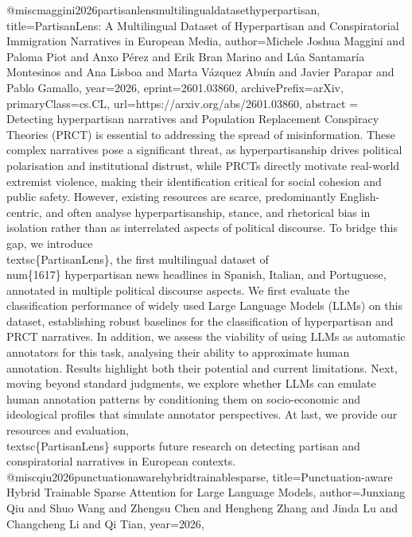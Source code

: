 {}@misc{maggini2026partisanlensmultilingualdatasethyperpartisan,
      title={PartisanLens: A Multilingual Dataset of Hyperpartisan and Conspiratorial Immigration Narratives in European Media}, 
      author={Michele Joshua Maggini and Paloma Piot and Anxo Pérez and Erik Bran Marino and Lúa Santamaría Montesinos and Ana Lisboa and Marta Vázquez Abuín and Javier Parapar and Pablo Gamallo},
      year={2026},
      eprint={2601.03860},
      archivePrefix={arXiv},
      primaryClass={cs.CL},
      url={https://arxiv.org/abs/2601.03860},
      abstract = {Detecting hyperpartisan narratives and Population Replacement Conspiracy Theories (PRCT) is essential to addressing the spread of misinformation. These complex narratives pose a significant threat, as hyperpartisanship drives political polarisation and institutional distrust, while PRCTs directly motivate real-world extremist violence, making their identification critical for social cohesion and public safety. However, existing resources are scarce, predominantly English-centric, and often analyse hyperpartisanship, stance, and rhetorical bias in isolation rather than as interrelated aspects of political discourse. To bridge this gap, we introduce \\textsc\{PartisanLens\}, the first multilingual dataset of \\num\{1617\} hyperpartisan news headlines in Spanish, Italian, and Portuguese, annotated in multiple political discourse aspects. We first evaluate the classification performance of widely used Large Language Models (LLMs) on this dataset, establishing robust baselines for the classification of hyperpartisan and PRCT narratives. In addition, we assess the viability of using LLMs as automatic annotators for this task, analysing their ability to approximate human annotation. Results highlight both their potential and current limitations. Next, moving beyond standard judgments, we explore whether LLMs can emulate human annotation patterns by conditioning them on socio-economic and ideological profiles that simulate annotator perspectives. At last, we provide our resources and evaluation, \\textsc\{PartisanLens\} supports future research on detecting partisan and conspiratorial narratives in European contexts.}
}@misc{qiu2026punctuationawarehybridtrainablesparse,
      title={Punctuation-aware Hybrid Trainable Sparse Attention for Large Language Models}, 
      author={Junxiang Qiu and Shuo Wang and Zhengsu Chen and Hengheng Zhang and Jinda Lu and Changcheng Li and Qi Tian},
      year={2026},
}
